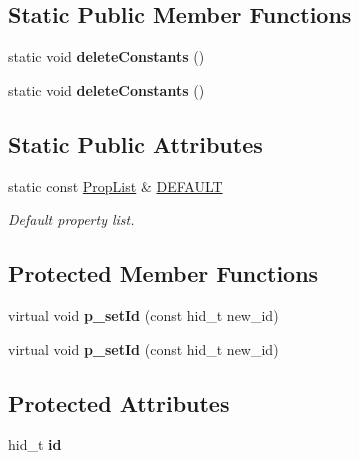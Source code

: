 \subsection*{Static Public Member Functions}
\begin{DoxyCompactItemize}
\item 
\mbox{\label{class_h5_1_1_prop_list_a3b40b494446d925002f6a72ef7b2c5e2}} 
static void {\bfseries delete\+Constants} ()
\item 
\mbox{\label{class_h5_1_1_prop_list_a3b40b494446d925002f6a72ef7b2c5e2}} 
static void {\bfseries delete\+Constants} ()
\end{DoxyCompactItemize}
\subsection*{Static Public Attributes}
\begin{DoxyCompactItemize}
\item 
\mbox{\label{class_h5_1_1_prop_list_ae52af66ce82af0ea7e6dc57148c56241}} 
static const \hyperlink{class_h5_1_1_prop_list}{Prop\+List} \& \hyperlink{class_h5_1_1_prop_list_ae52af66ce82af0ea7e6dc57148c56241}{D\+E\+F\+A\+U\+LT}
\begin{DoxyCompactList}\small\item\em Default property list. \end{DoxyCompactList}\end{DoxyCompactItemize}
\subsection*{Protected Member Functions}
\begin{DoxyCompactItemize}
\item 
\mbox{\label{class_h5_1_1_prop_list_a20b46c6b3574b7efe9cb909ad26bbda0}} 
virtual void {\bfseries p\+\_\+set\+Id} (const hid\+\_\+t new\+\_\+id)
\item 
\mbox{\label{class_h5_1_1_prop_list_a20b46c6b3574b7efe9cb909ad26bbda0}} 
virtual void {\bfseries p\+\_\+set\+Id} (const hid\+\_\+t new\+\_\+id)
\end{DoxyCompactItemize}
\subsection*{Protected Attributes}
\begin{DoxyCompactItemize}
\item 
\mbox{\label{class_h5_1_1_prop_list_aba4b7945429d1ca9ab6444f330064d5b}} 
hid\+\_\+t {\bfseries id}
\end{DoxyCompactItemize}
